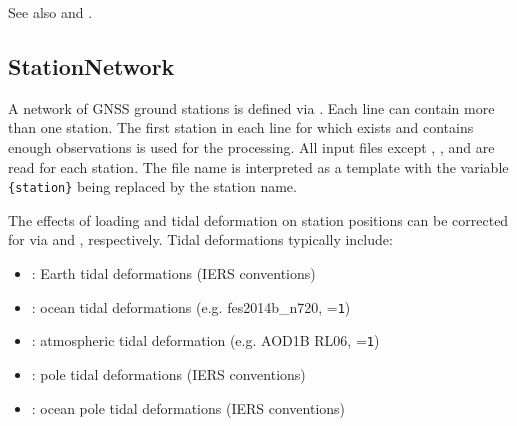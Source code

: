 See also  and .


\subsection{StationNetwork}\label{gnssReceiverGeneratorType:stationNetwork}
A network of GNSS ground stations is defined via .
Each line can contain more than one station. The first station in each line for which 
exists and contains enough observations is used for the processing.
All input files except ,
, and
 are read for each station.
The file name is interpreted as a template with the variable \verb|{station}| being replaced by the station name.

The effects of loading and tidal deformation on station positions can be corrected for
via  and
, respectively.
Tidal deformations typically include:
\begin{itemize}
  \item {}: Earth tidal deformations (IERS conventions)
  \item {}: ocean tidal deformations
        (e.g. fes2014b\_n720, =\verb|1|)
  \item {}: atmospheric tidal deformation
        (e.g. AOD1B RL06, =\verb|1|)
  \item {}: pole tidal deformations (IERS conventions)
  \item {}: ocean pole tidal deformations (IERS conventions)
\end{itemize}



